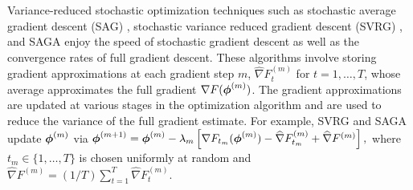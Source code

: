 Variance-reduced stochastic optimization techniques such as stochastic average gradient descent (SAG) \citep{Schmidt:2017}, stochastic variance reduced gradient descent (SVRG) \citep{Johnson:2013}, and SAGA \citep{Defazio:2014} enjoy the speed of stochastic gradient descent as well as the convergence rates of full gradient descent. These algorithms involve storing gradient approximations at each gradient step $m$, $\widehat \nabla F_{t}^{(m)}$ for $t = 1,\ldots,T$, whose average approximates the full gradient $\nabla F(\boldsymbol{\phi}^{(m)})$. The gradient approximations are updated at various stages in the optimization algorithm and are used to reduce the variance of the full gradient estimate. 
%
%
For example, SVRG and SAGA update $\boldsymbol{\phi}^{(m)}$ via
%
    $\boldsymbol{\phi}^{(m+1)} = \boldsymbol{\phi}^{(m)} - \lambda_m \left[\nabla F_{t_m}(\boldsymbol{\phi}^{(m)}) - \widehat \nabla F_{t_m}^{(m)} + \widehat \nabla F^{(m)} \right],$
%
where $t_m \in \{1,\ldots,T\}$ is chosen uniformly at random and
%
    $\widehat \nabla F^{(m)} = (1/T) \sum_{t=1}^T \widehat \nabla F_{t}^{(m)}$.
%

